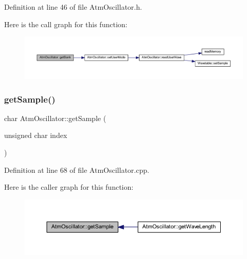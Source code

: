 Definition at line 46 of file Atm\+Oscillator.\+h.

Here is the call graph for this function\+:
\nopagebreak
\begin{figure}[H]
\begin{center}
\leavevmode
\includegraphics[width=350pt]{class_atm_oscillator_a56b407e4175f4625e2e0d7a6f87c2225_cgraph}
\end{center}
\end{figure}
\mbox{\label{class_atm_oscillator_aa6fe7de8b2d573159271a47f5c8686e1}} 
\subsubsection{\texorpdfstring{get\+Sample()}{getSample()}}
{\footnotesize\ttfamily char Atm\+Oscillator\+::get\+Sample (\begin{DoxyParamCaption}\item[{unsigned char}]{index }\end{DoxyParamCaption})}



Definition at line 68 of file Atm\+Oscillator.\+cpp.

Here is the caller graph for this function\+:
\nopagebreak
\begin{figure}[H]
\begin{center}
\leavevmode
\includegraphics[width=350pt]{class_atm_oscillator_aa6fe7de8b2d573159271a47f5c8686e1_icgraph}
\end{center}
\end{figure}
\mbox{\label{class_atm_oscillator_a01e9856e38a1e83b5d83fd503d5ad80e}} 
